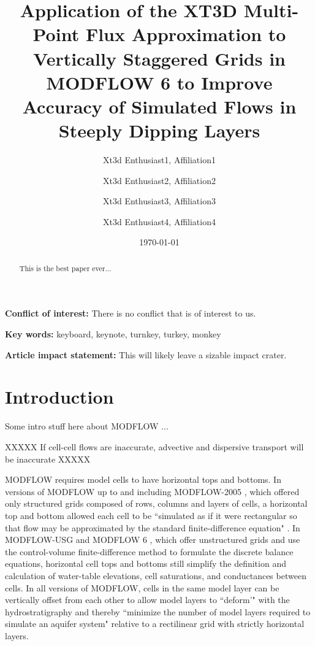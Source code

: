 \documentclass{article}
\title{Application of the XT3D Multi-Point Flux Approximation to Vertically Staggered Grids in MODFLOW 6 to Improve Accuracy of Simulated Flows in Steeply Dipping Layers}
\author{
	Xt3d Enthusiast1, Affiliation1  \\
	\and 
	Xt3d Enthusiast2, Affiliation2 \\
	\and 
	Xt3d Enthusiast3, Affiliation3 \\
	\and 
	Xt3d Enthusiast4, Affiliation4 \\
	}
\date{\today}
\begin{document}
\maketitle

\textbf{Conflict of interest:} There is no conflict that is of interest to us.

\textbf{Key words:} keyboard, keynote, turnkey, turkey, monkey

\textbf{Article impact statement:} This will likely leave a sizable impact crater.

\begin{abstract}
This is the best paper ever...
\end{abstract}

\section{Introduction}

Some intro stuff here about MODFLOW \citep{modflow6framework, modflow6gwf, modflow6gwt}...

XXXXX If cell-cell flows are inaccurate, advective and dispersive transport will be inaccurate XXXXX

MODFLOW requires model cells to have horizontal tops and bottoms. In versions of MODFLOW up to and including MODFLOW-2005 \citep{modflow2005}, which offered only structured grids composed of rows, columns and layers of cells, a horizontal top and bottom allowed each cell to be ``simulated as if it were rectangular so that flow may be approximated by the standard finite-difference equation" \citep{modflow84}. In MODFLOW-USG \citep{modflowusg} and MODFLOW 6 \citep{modflow6gwf}, which offer unstructured grids and use the control-volume finite-difference method to formulate the discrete balance equations, horizontal cell tops and bottoms still simplify the definition and calculation of water-table elevations, cell saturations, and conductances between cells. In all versions of MODFLOW, cells in the same model layer can be vertically offset from each other to allow model layers to ``deform'" with the hydrostratigraphy and thereby ``minimize the number of model layers required to simulate an aquifer system" \citep{modflow84} relative to a rectilinear grid with strictly horizontal layers.
\end{document}
